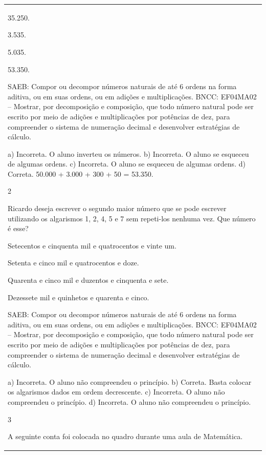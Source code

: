 \begin{mdframed}[linewidth=2pt,linecolor=salmao,roundcorner=2pt]
\begin{escolha}
{{{\begin{longtable}[]{@{}l@{}}
\begin{itemize}
{\begin{escolha}
\item
  35.250.
\item
  3.535.
\item
  5.035.
\item
  53.350.
\end{escolha}

SAEB: Compor ou decompor números naturais de até 6 ordens na
forma aditiva, ou em suas ordens, ou em adições e multiplicações.
BNCC: EF04MA02 -- Mostrar, por decomposição e composição, que todo número natural pode ser escrito
por meio de adições e multiplicações por potências de dez, para compreender o sistema de
numeração decimal e desenvolver estratégias de cálculo.

a) Incorreta. O aluno inverteu os números.
b) Incorreta. O aluno se esqueceu de algumas ordens.
c) Incorreta. O aluno se esqueceu de algumas ordens.
d) Correta. 50.000 + 3.000 + 300 + 50 = 53.350.

\num{2}

Ricardo deseja escrever o segundo maior número que se pode escrever
utilizando os algarismos 1, 2, 4, 5 e 7 sem repeti-los nenhuma vez.
Que número é esse?

\begin{escolha}
\item
  Setecentos e cinquenta mil e quatrocentos e vinte um.
\item
  Setenta e cinco mil e quatrocentos e doze.
\item
  Quarenta e cinco mil e duzentos e cinquenta e sete.
\item
  Dezessete mil e quinhetos e quarenta e cinco.
\end{escolha}

SAEB: Compor ou decompor números naturais de até 6 ordens na
forma aditiva, ou em suas ordens, ou em adições e multiplicações.
BNCC: EF04MA02 -- Mostrar, por decomposição e composição, que todo número natural pode ser escrito
por meio de adições e multiplicações por potências de dez, para compreender o sistema de
numeração decimal e desenvolver estratégias de cálculo.

a) Incorreta. O aluno não compreendeu o princípio.
b) Correta. Basta colocar os algarismos dados em ordem decrescente.
c) Incorreta. O aluno não compreendeu o princípio.
d) Incorreta. O aluno não compreendeu o princípio.

\num{3}

A seguinte conta foi colocada no quadro durante uma aula de Matemática.

}
\end{itemize}
\end{longtable}}}}
\end{escolha}
\end{mdframed}
